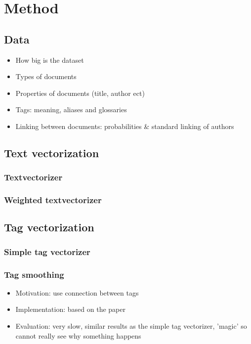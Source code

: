 \section{Method}
\subsection{Data}
\begin{itemize}
\item How big is the dataset
\item Types of documents
\item Properties of documents (title, author ect)
\item Tags: meaning, aliases and glossaries
\item Linking between documents: probabilities \& standard linking of authors
\end{itemize}

\subsection{Text vectorization}
\subsubsection{Textvectorizer}


\subsubsection{Weighted textvectorizer}


\subsection{Tag vectorization}
\subsubsection{Simple tag vectorizer}


\subsubsection{Tag smoothing}
\begin{itemize}
\item Motivation: use connection between tags
\item Implementation: based on the paper
\item Evaluation: very slow, similar results as the simple tag vectorizer, 'magic' so cannot really see why something happens
\end{itemize}

